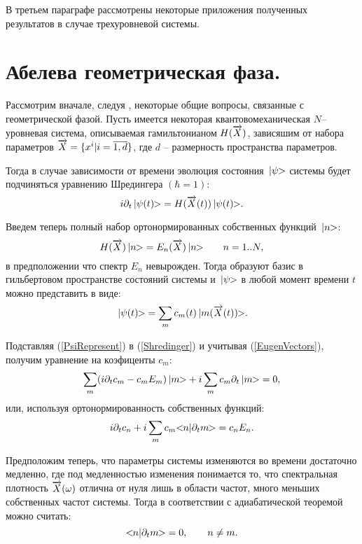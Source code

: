 \documentclass[a4paper,titlepage]{article}
\newcommand{\MathBr}[1]{\ifmmode{#1} \else{$#1$} \fi}
\newcommand{\KetVect}[1]{\MathBr{\,|#1\!\!>}}
\newcommand{\DirProd}[2]{\MathBr{<\!\!#1|#2\!\!>}}
\newcommand{\XVect}{\MathBr{\overrightarrow{X}}}
\newcommand{\rf}[1]{(\ref{#1})}
\newcommand{\der}[1]{\MathBr{\partial_{#1}}}
\begin{document}
В третьем параграфе рассмотрены некоторые приложения полученных результатов
в случае трехуровневой системы.

\newpage
\section{Абелева геометрическая фаза.}

Рассмотрим вначале, следуя \cite{AboutPhaseInSpectra}, некоторые общие вопросы,
связанные с геометрической фазой. Пусть имеется некоторая
квантовомеханическая $N$-- уровневая система, описываемая гамильтонианом
$H(\XVect)$, зависяшим от набора параметров
$\XVect = \{x^i|i = \overline{1,d}\}$, где $d$ -- размерность
пространства параметров.

Тогда в случае зависимости \XVect от времени
эволюция состояния $\KetVect{\psi}$ системы будет подчиняться
уравнению Шредингера $(\hbar = 1)$:
\begin{equation}
   i \der{t}\KetVect{\psi(t)} = H(\XVect(t))\KetVect{\psi(t)}.
\label{Shredinger}
\end{equation}

Введем теперь полный набор ортонормированных собственных функций
$\KetVect{n}$:
\begin{equation}
   H(\XVect)\KetVect{n} = E_n(\XVect)\KetVect{n}
   \qquad n = 1..N,
\label{EugenVectors}
\end{equation}
в предположении что спектр $E_n$ невырожден. Тогда \KetVect{n} образуют
базис в гильбертовом пространстве состояний системы и $\KetVect{\psi}$ в
любой момент времени $t$ можно представить в виде:
\begin{equation}
  \KetVect{\psi(t)} = \sum_m c_m(t)\KetVect{m(\XVect(t))}.
\label{PsiRepresent}
\end{equation}

Подставляя \rf{PsiRepresent} в \rf{Shredinger} и учитывая \rf{EugenVectors},
получим уравнение на коэфиценты $c_m$:
\begin{equation}
  \sum_m (i\der{t}c_m - c_m E_m)\KetVect{m}
     + i \sum_m c_m \der{t}\KetVect{m} = 0,
\label{EqnForCN}
\end{equation}
или, используя ортонормированность собственных функций:
\begin{equation}
  i\der{t}c_n + i \sum_m c_m \DirProd{n}{\der{t}m} = c_n E_n.
\label{OneEqnForCN}
\end{equation}

Предположим теперь, что параметры системы \XVect изменяются во времени
достаточно медленно, где под медленностью изменения понимается то, что
спектральная плотность $\XVect(\omega)$ отлична от нуля лишь в области
частот, много меньших собственных частот системы. Тогда в соответствии с
адиабатической теоремой \cite{BornAndFock} можно считать:
\[
  \DirProd{n}{\der{t}m} = 0, \qquad n \ne m.
\]
\end{document}
